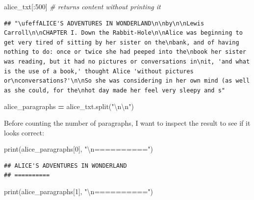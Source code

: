 \documentclass[]{book}
\newenvironment{Shaded}{\begin{snugshade}}{\end{snugshade}}
\newcommand{\BuiltInTok}[1]{#1}
\newcommand{\CharTok}[1]{\textcolor[rgb]{0.31,0.60,0.02}{#1}}
\newcommand{\CommentTok}[1]{\textcolor[rgb]{0.56,0.35,0.01}{\textit{#1}}}
\newcommand{\DecValTok}[1]{\textcolor[rgb]{0.00,0.00,0.81}{#1}}
\newcommand{\NormalTok}[1]{#1}
\newcommand{\OperatorTok}[1]{\textcolor[rgb]{0.81,0.36,0.00}{\textbf{#1}}}
\newcommand{\StringTok}[1]{\textcolor[rgb]{0.31,0.60,0.02}{#1}}
\begin{document}
\begin{Shaded}
\begin{Highlighting}[]
\NormalTok{alice_txt[:}\DecValTok{500}\NormalTok{] }\CommentTok{# returns content without printing it}
\end{Highlighting}
\end{Shaded}

\begin{verbatim}
## "\ufeffALICE'S ADVENTURES IN WONDERLAND\n\nby\n\nLewis Carroll\n\nCHAPTER I. Down the Rabbit-Hole\n\nAlice was beginning to get very tired of sitting by her sister on the\nbank, and of having nothing to do: once or twice she had peeped into the\nbook her sister was reading, but it had no pictures or conversations in\nit, 'and what is the use of a book,' thought Alice 'without pictures or\nconversations?'\n\nSo she was considering in her own mind (as well as she could, for the\nhot day made her feel very sleepy and s"
\end{verbatim}

\begin{Shaded}
\begin{Highlighting}[]
\NormalTok{alice_paragraphs }\OperatorTok{=}\NormalTok{ alice_txt.split(}\StringTok{"}\CharTok{\textbackslash{}n\textbackslash{}n}\StringTok{"}\NormalTok{)}
\end{Highlighting}
\end{Shaded}

Before counting the number of paragraphs, I want to inspect the result to see if it looks correct:

\begin{Shaded}
\begin{Highlighting}[]
\BuiltInTok{print}\NormalTok{(alice_paragraphs[}\DecValTok{0}\NormalTok{], }\StringTok{"}\CharTok{\textbackslash{}n}\StringTok{=========="}\NormalTok{)}
\end{Highlighting}
\end{Shaded}

\begin{verbatim}
## ﻿ALICE'S ADVENTURES IN WONDERLAND 
## ==========
\end{verbatim}

\begin{Shaded}
\begin{Highlighting}[]
\BuiltInTok{print}\NormalTok{(alice_paragraphs[}\DecValTok{1}\NormalTok{], }\StringTok{"}\CharTok{\textbackslash{}n}\StringTok{=========="}\NormalTok{)}
\end{Highlighting}
\end{Shaded}
\end{document}
